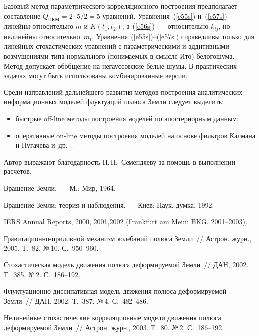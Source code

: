 \begin{multicols}{2}
Базовый метод параметрического корреляционного построения
предполагает составление $Q_{\mathrm{ ПКМ}} = 2\cdot 5/2=5$
уравнений. Уравнения~(\ref{e55s}) и~(\ref{e57s}) линейны относительно $m$ и $K(t_1,
t_2)$, а~(\ref{e56s})~--- относительно $k_{ij}$, но нелинейны относитель\-но~$m_i$.
 Уравнения~(\ref{e55s})--(\ref{e57s}) справедливы только для линейных
стохастических уравнений с параметрическими и аддитивными
возмущениями типа нормального (понимаемых в смысле Ито) белого\linebreak  шума.
Метод допускает обобщение на негауссовские белые шумы. В
практических задачах могут быть использованы комбинированные версии.

Среди направлений дальнейшего развития методов построения
аналитических информационных моделей флуктуаций полюса Земли
следует выделить:
\begin{itemize}
\item быстрые off-line методы построения моделей по апостериорным
данным;
\item
 оперативные on-line методы построения моделей на основе
фильтров Калмана и Пугачева и~др.~\cite{24s, 25s}.
\end{itemize}

\bigskip
Автор выражают благодарность Н.\,Н.~Семендяеву за помощь в выполнении
расчетов.

{\small\frenchspacing
{%
\begin{thebibliography}{99}
Вращение Земли.~--- М.: Мир, 1964.

Вращение Земли: теория и наблюдения.~--- Киев: Наук. думка, 1992.

IERS Annual Reports, 2000, 2001,2002 (Frankfurt am Mein: BKG. 2001--2003).

Гравитационно-приливной механизм колебаний полюса Земли~// Астрон.
журн., 2005. Т.~82. №\,10. С.~950--960.

Стохастическая модель движения
полюса деформируемой Земли~// ДАН, 2002. Т.~385. №\,2. С.~186--192.

Флуктуационно-дис\-си\-па\-тивная
модель движения полюса деформируемой Земли~// ДАН, 2002. Т.~387.
№\,4. С.~482--486.

Нелинейные стохастические
корреляционные модели движения полюса деформируемой Земли~// Астрон.
журн., 2003. Т.~80. №\,2. С.~186--192.


\end{thebibliography}}}
\end{multicols}
